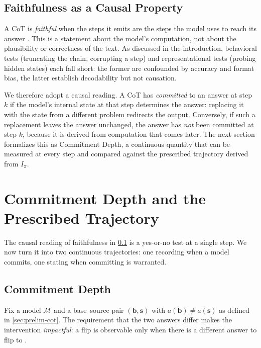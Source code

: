 \documentclass[11pt]{article}
\newcommand{\stepk}{k}
\begin{document}
\subsection{Faithfulness as a Causal Property}
\label{sec:prelim-faithfulness}

A CoT is \emph{faithful} when the steps it emits are the steps the model uses
to reach its answer \citep{DBLP:conf/acl/JacoviG20}. This is a statement about
the model's computation, not about the plausibility or correctness of the text.
As discussed in the introduction, behavioral tests (truncating the chain,
corrupting a step) and representational tests (probing hidden states) each fall
short: the former are confounded by accuracy and format bias, the latter
establish decodability but not causation.

We therefore adopt a causal reading. A CoT has \emph{committed} to an answer at
step $\stepk$ if the model's internal state at that step determines the answer:
replacing it with the state from a different problem redirects the output.
Conversely, if such a replacement leaves the answer unchanged, the answer has
\emph{not} been committed at step $\stepk$, because it is derived from
computation that comes later. The next section formalizes this as Commitment
Depth, a continuous quantity that can be measured at every step and compared
against the prescribed trajectory derived from $I_{\pi}$.

\section{Commitment Depth and the Prescribed Trajectory}
\label{sec:cd}

The causal reading of faithfulness in \cref{sec:prelim-faithfulness} is a
yes-or-no test at a single step. We now turn it into two continuous
trajectories: one recording when a model commits, one stating when committing is
warranted.

\subsection{Commitment Depth}
\label{sec:cd-def}

Fix a model $\mathcal{M}$ and a base--source pair $(\mathbf{b},\mathbf{s})$
with $a(\mathbf{b})\neq a(\mathbf{s})$ as defined in \cref{sec:prelim-cot}.
The requirement that the two answers differ makes the intervention
\emph{impactful}: a flip is observable only when there is a different answer to
flip to \citep{DBLP:conf/nips/GeigerLIP21}.
\end{document}
